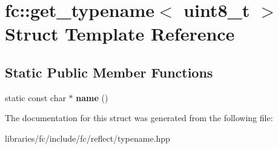 \hypertarget{structfc_1_1get__typename_3_01uint8__t_01_4}{}\section{fc\+:\+:get\+\_\+typename$<$ uint8\+\_\+t $>$ Struct Template Reference}
\label{structfc_1_1get__typename_3_01uint8__t_01_4}
\subsection*{Static Public Member Functions}
\begin{DoxyCompactItemize}
\item 
\mbox{\label{structfc_1_1get__typename_3_01uint8__t_01_4_a44ac3bd085c278f6fb62d88042b68e18}} 
static const char $\ast$ {\bfseries name} ()
\end{DoxyCompactItemize}


The documentation for this struct was generated from the following file\+:\begin{DoxyCompactItemize}
\item 
libraries/fc/include/fc/reflect/typename.\+hpp\end{DoxyCompactItemize}
